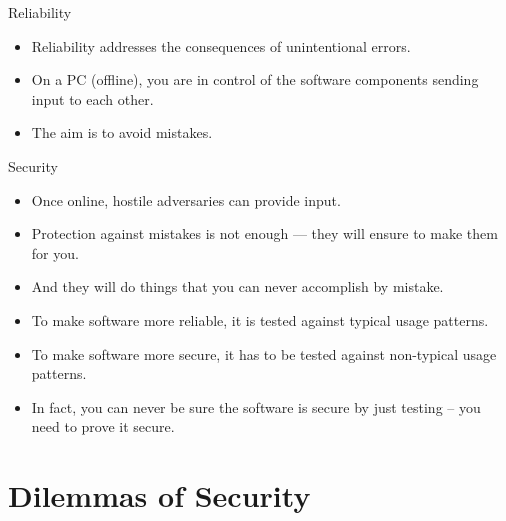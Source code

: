 \documentclass{beamer}
\begin{document}
\begin{frame}
  \begin{block}{Reliability}
    \begin{itemize}
      \item Reliability addresses the consequences of unintentional errors.

      \item On a PC (offline), you are in control of the software components 
        sending input to each other.

      \item The aim is to avoid mistakes.
    \end{itemize}
  \end{block}

  \pause{}

  \begin{block}{Security}
    \begin{itemize}
      \item Once online, hostile adversaries can provide input.

      \item Protection against mistakes is not enough --- they will ensure to 
        make them for you.

      \item And they will do things that you can never accomplish by mistake.
    \end{itemize}
  \end{block}
\end{frame}

\begin{frame}
  \begin{itemize}
    \item To make software more reliable, it is tested against typical usage 
      patterns.

    \item To make software more secure, it has to be tested against non-typical 
      usage patterns.

    \item In fact, you can never be sure the software is secure by just testing 
      -- you need to prove it secure.
  \end{itemize}
\end{frame}


\section{Dilemmas of Security}
\end{document}
